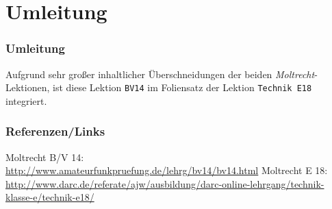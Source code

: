 

\subtitle{Betriebstechnik/Vorschriften 14: \\
          Störungen, EMV und EMVU, Sicherheit \\[2em]}
\date{Stand 05.02.2015}


\section{Umleitung}

\begin{frame}
    \frametitle{Umleitung}

    Aufgrund sehr großer inhaltlicher Überschneidungen der beiden
    \emph{Moltrecht}-Lektionen, ist diese Lektion
    \texttt{BV14}\hyperlink{refs}{\cite{bv14}} im Foliensatz der Lektion
    \texttt{Technik E18}\hyperlink{refs}{\cite{e18}} integriert.

\end{frame}

\renewcommand{\refname}{Referenzen}

\begin{frame}
    \frametitle{Referenzen/Links}
    \hypertarget{refs}{}
    \footnotesize

    \begin{thebibliography}{}
          Moltrecht B/V 14: \\
                        \url{http://www.amateurfunkpruefung.de/lehrg/bv14/bv14.html}
           Moltrecht E 18: \\
                        \url{http://www.darc.de/referate/ajw/ausbildung/darc-online-lehrgang/technik-klasse-e/technik-e18/}
    \end{thebibliography} 
   
\end{frame}


